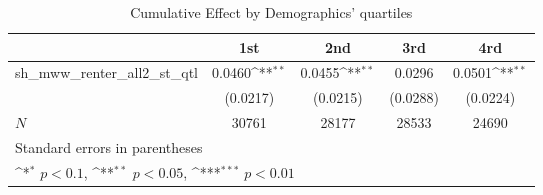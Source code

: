 \begin{table}[htbp]\centering
\def\sym#1{\ifmmode^{#1}\else\(^{#1}\)\fi}
\caption{Cumulative Effect by Demographics' quartiles}
\begin{tabular}{l*{4}{c}}
\hline\hline
            &\multicolumn{1}{c}{1st}&\multicolumn{1}{c}{2nd}&\multicolumn{1}{c}{3rd}&\multicolumn{1}{c}{4rd}\\
\hline
sh\_mww\_renter\_all2\_st\_qtl&      0.0460\sym{**} &      0.0455\sym{**} &      0.0296         &      0.0501\sym{**} \\
            &    (0.0217)         &    (0.0215)         &    (0.0288)         &    (0.0224)         \\
\hline
\(N\)       &       30761         &       28177         &       28533         &       24690         \\
\hline\hline
\multicolumn{5}{l}{\footnotesize Standard errors in parentheses}\\
\multicolumn{5}{l}{\footnotesize \sym{*} \(p<0.1\), \sym{**} \(p<0.05\), \sym{***} \(p<0.01\)}\\
\end{tabular}
\end{table}
